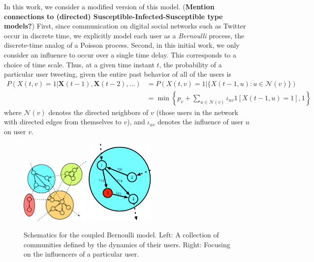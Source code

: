 \documentclass[12pt]{article}
\begin{document}
In this work, we consider a modified version of this model. (\textbf{Mention connections to (directed) Susceptible-Infected-Susceptible type models?}) First, since communication on digital social networks such as Twitter occur in discrete time, we explicitly model each user as a \emph{Bernoulli} process, the discrete-time analog of a Poisson process. Second, in this initial work, we only consider an influence to occur over a single time delay. This corresponds to a choice of time scale. Thus, at a given time instant $t$, the probability of a particular user tweeting, given the entire past behavior of all of the users is
\begin{align}
	P(X(t, v) = 1 | \mathbf{X}(t-1), \mathbf{X}(t-2), \ldots) &= P(X(t,v) = 1 | \{ X(t-1, u) : u \in \mathcal{N}(v)\})\\
	&=\min \left\{p_{v} + \sum_{u \in \mathcal{N}(v)} \iota_{uv} 1[X(t-1, u) = 1], 1\right\} \label{Eq-Bernoulli_Model}
\end{align}
where $\mathcal{N}(v)$ denotes the directed neighbors of $v$ (those users in the network with directed edges from themselves to $v$), and $\iota_{uv}$ denotes the influence of user $u$ on user $v$.

\begin{figure}[h!]
  \centering
\includegraphics[width=0.3\textwidth]{Figures/Communities.eps} \hspace{1 in}
\includegraphics[width=0.3\textwidth]{Figures/Toy2.eps}
\caption{Schematics for the coupled Bernoulli model. Left: A collection of communities defined by the dynamics of their users. Right: Focusing on the influencers of a particular user.}
\label{Fig-Toy_Bernoulli}
\end{figure}
\end{document}
